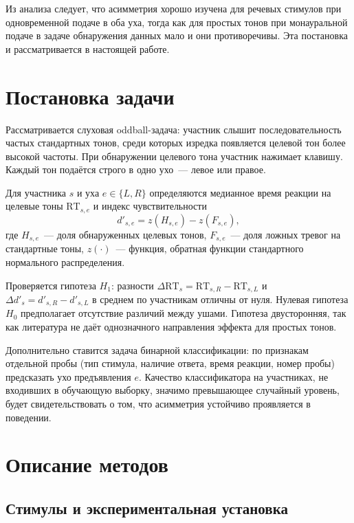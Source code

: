 \documentclass{misisarticle}
\begin{document}
Из анализа следует, что асимметрия хорошо изучена для речевых стимулов при одновременной подаче в оба уха, тогда как для простых тонов при монауральной подаче в задаче обнаружения данных мало и они противоречивы. Эта постановка и рассматривается в настоящей работе.

\section{Постановка задачи}

Рассматривается слуховая oddball-задача: участник слышит последовательность частых стандартных тонов, среди которых изредка появляется целевой тон более высокой частоты. При обнаружении целевого тона участник нажимает клавишу. Каждый тон подаётся строго в одно ухо~--- левое или правое.

Для участника $s$ и уха $e \in \{L, R\}$ определяются медианное время реакции на целевые тоны $\mathrm{RT}_{s,e}$ и индекс чувствительности
\begin{equation}
  d'_{s,e} = z(H_{s,e}) - z(F_{s,e}),
  \label{eq:dprime}
\end{equation}
где $H_{s,e}$~--- доля обнаруженных целевых тонов, $F_{s,e}$~--- доля ложных тревог на стандартные тоны, $z(\cdot)$~--- функция, обратная функции стандартного нормального распределения.

Проверяется гипотеза $H_1$: разности $\Delta\mathrm{RT}_s = \mathrm{RT}_{s,R} - \mathrm{RT}_{s,L}$ и $\Delta d'_s = d'_{s,R} - d'_{s,L}$ в среднем по участникам отличны от нуля. Нулевая гипотеза $H_0$ предполагает отсутствие различий между ушами. Гипотеза двусторонняя, так как литература не даёт однозначного направления эффекта для простых тонов.

Дополнительно ставится задача бинарной классификации: по признакам отдельной пробы (тип стимула, наличие ответа, время реакции, номер пробы) предсказать ухо предъявления $e$. Качество классификатора на участниках, не входивших в обучающую выборку, значимо превышающее случайный уровень, будет свидетельствовать о том, что асимметрия устойчиво проявляется в поведении.

\section{Описание методов}

\subsection{Стимулы и экспериментальная установка}
\end{document}
